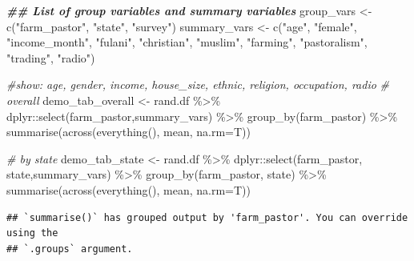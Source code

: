 \documentclass[
]{article}
\newenvironment{Shaded}{\begin{snugshade}}{\end{snugshade}}
\newcommand{\AttributeTok}[1]{\textcolor[rgb]{0.77,0.63,0.00}{#1}}
\newcommand{\CommentTok}[1]{\textcolor[rgb]{0.56,0.35,0.01}{\textit{#1}}}
\newcommand{\DocumentationTok}[1]{\textcolor[rgb]{0.56,0.35,0.01}{\textbf{\textit{#1}}}}
\newcommand{\FunctionTok}[1]{\textcolor[rgb]{0.00,0.00,0.00}{#1}}
\newcommand{\NormalTok}[1]{#1}
\newcommand{\OtherTok}[1]{\textcolor[rgb]{0.56,0.35,0.01}{#1}}
\newcommand{\SpecialCharTok}[1]{\textcolor[rgb]{0.00,0.00,0.00}{#1}}
\newcommand{\StringTok}[1]{\textcolor[rgb]{0.31,0.60,0.02}{#1}}
\begin{document}
\begin{Shaded}
\begin{Highlighting}[]
\DocumentationTok{\#\# List of group variables and summary variables}
\NormalTok{group\_vars }\OtherTok{\textless{}{-}} \FunctionTok{c}\NormalTok{(}\StringTok{"farm\_pastor"}\NormalTok{, }\StringTok{"state"}\NormalTok{, }\StringTok{"survey"}\NormalTok{)}
\NormalTok{summary\_vars }\OtherTok{\textless{}{-}} \FunctionTok{c}\NormalTok{(}\StringTok{"age"}\NormalTok{, }\StringTok{"female"}\NormalTok{, }\StringTok{"income\_month"}\NormalTok{, }
                  \StringTok{"fulani"}\NormalTok{, }\StringTok{"christian"}\NormalTok{, }\StringTok{"muslim"}\NormalTok{,}
                  \StringTok{"farming"}\NormalTok{, }\StringTok{"pastoralism"}\NormalTok{, }\StringTok{"trading"}\NormalTok{,}
                  \StringTok{"radio"}\NormalTok{)}

\CommentTok{\#show: age, gender, income, house\_size, ethnic, religion, occupation, radio}
\CommentTok{\# overall}
\NormalTok{demo\_tab\_overall }\OtherTok{\textless{}{-}}\NormalTok{ rand.df }\SpecialCharTok{\%\textgreater{}\%}\NormalTok{ dplyr}\SpecialCharTok{::}\FunctionTok{select}\NormalTok{(farm\_pastor,summary\_vars) }\SpecialCharTok{\%\textgreater{}\%}
  \FunctionTok{group\_by}\NormalTok{(farm\_pastor) }\SpecialCharTok{\%\textgreater{}\%}
  \FunctionTok{summarise}\NormalTok{(}\FunctionTok{across}\NormalTok{(}\FunctionTok{everything}\NormalTok{(), mean, }\AttributeTok{na.rm=}\NormalTok{T))}

\CommentTok{\# by state}
\NormalTok{demo\_tab\_state }\OtherTok{\textless{}{-}}\NormalTok{ rand.df }\SpecialCharTok{\%\textgreater{}\%}\NormalTok{ dplyr}\SpecialCharTok{::}\FunctionTok{select}\NormalTok{(farm\_pastor, state,summary\_vars) }\SpecialCharTok{\%\textgreater{}\%}
  \FunctionTok{group\_by}\NormalTok{(farm\_pastor, state) }\SpecialCharTok{\%\textgreater{}\%}
  \FunctionTok{summarise}\NormalTok{(}\FunctionTok{across}\NormalTok{(}\FunctionTok{everything}\NormalTok{(), mean, }\AttributeTok{na.rm=}\NormalTok{T))}
\end{Highlighting}
\end{Shaded}

\begin{verbatim}
## `summarise()` has grouped output by 'farm_pastor'. You can override using the
## `.groups` argument.
\end{verbatim}
\end{document}
